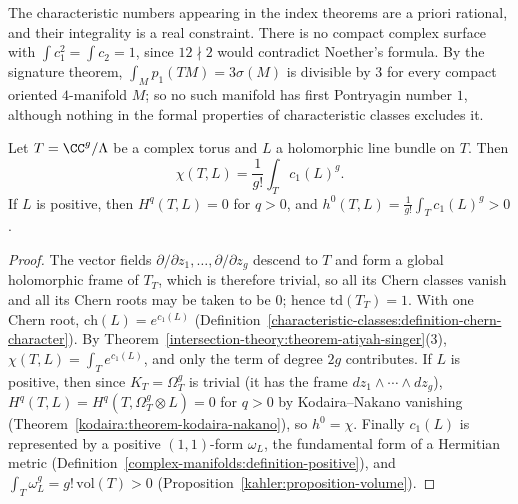 \begin{counterexample}\label{intersection-theory:counterexample-integrality}
The characteristic numbers appearing in the index theorems are a priori rational, and their integrality is a real constraint. There is no compact complex surface with $\int c_1^2 = \int c_2 = 1$, since $12 \nmid 2$ would contradict
Noether's formula. By the signature theorem, $\int_Mp_1(TM) = 3\sigma(M)$ is divisible by $3$ for every compact oriented $4$-manifold $M$; so no such manifold has first Pontryagin number $1$, although nothing in the formal properties
of characteristic classes excludes it.
\end{counterexample}

\begin{proposition}\label{intersection-theory:proposition-rr-tori}
Let $T = \CC^g/\Lambda$ be a complex torus and $L$ a holomorphic line bundle on $T$. Then
\[
\chi(T, L) = \frac{1}{g!}\int_Tc_1(L)^g .
\]
If $L$ is positive, then $H^q(T, L) = 0$ for $q > 0$, and $h^0(T, L) = \frac{1}{g!}\int_Tc_1(L)^g > 0$.
\end{proposition}

\begin{proof}
The vector fields $\partial/\partial z_1, \ldots, \partial/\partial z_g$ descend to $T$ and form a global holomorphic frame of $T_T$, which is therefore trivial, so all its Chern classes vanish and all its Chern roots may be taken
to be $0$; hence $\mathrm{td}(T_T) = 1$. With one Chern root, $\mathrm{ch}(L) = e^{c_1(L)}$ (Definition~\ref{characteristic-classes:definition-chern-character}). By
Theorem~\ref{intersection-theory:theorem-atiyah-singer}(3), $\chi(T, L) = \int_Te^{c_1(L)}$, and only the term of degree $2g$ contributes. If $L$ is positive, then since $K_T = \Omega^g_T$ is trivial (it has the frame
$dz_1 \wedge \cdots \wedge dz_g$), $H^q(T, L) = H^q(T, \Omega^g_T \otimes L) = 0$ for $q > 0$ by Kodaira--Nakano vanishing (Theorem~\ref{kodaira:theorem-kodaira-nakano}), so $h^0 = \chi$. Finally $c_1(L)$ is
represented by a positive $(1,1)$-form $\omega_L$, the fundamental form of a Hermitian metric (Definition~\ref{complex-manifolds:definition-positive}), and $\int_T\omega_L^g = g!\,\mathrm{vol}(T) > 0$
(Proposition~\ref{kahler:proposition-volume}).
\end{proof}

